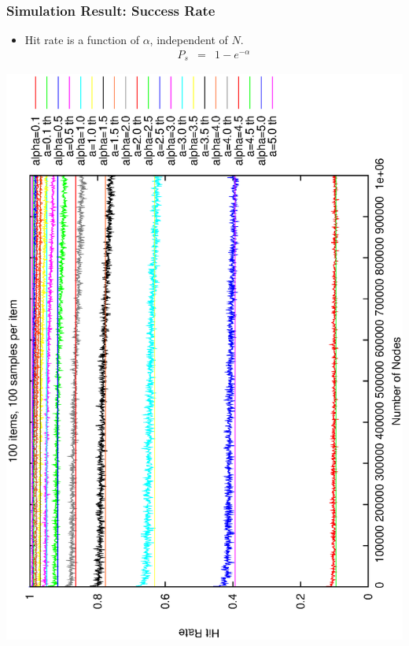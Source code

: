 \documentclass[red]{beamer}
\begin{document}
\begin{frame}
\frametitle{Simulation Result: Success Rate}
\begin{itemize}
\item Hit rate is a function of $\alpha$, independent of $N$.
\begin{eqnarray*}
P_s &=& 1-e^{-\alpha}
\end{eqnarray*}
\end{itemize}
\center
\includegraphics[angle=270, scale=0.26]{figs/th_hitrate.eps}

\end{frame}
\end{document}
